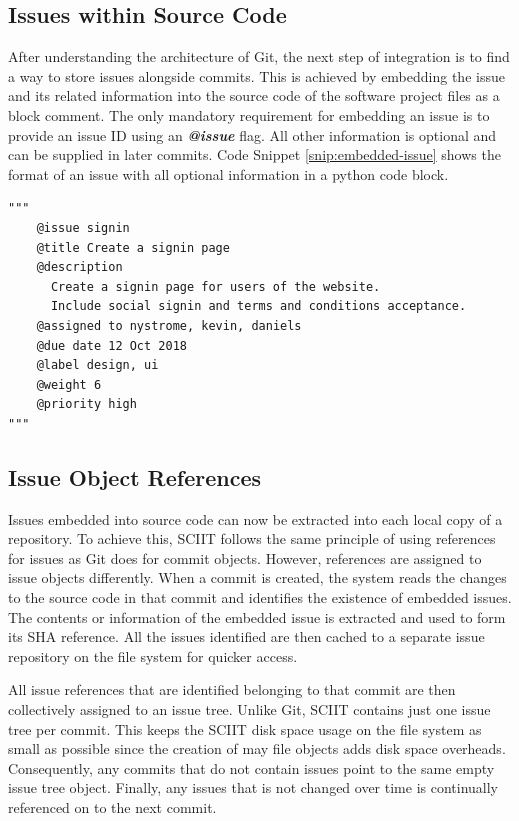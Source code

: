 \documentclass{mproj}
\newenvironment{code}{\captionsetup{type=listing}}{}
\begin{document}
\subsection{Issues within Source Code}

After understanding the architecture of Git, the next step of integration is to find a way to store issues alongside commits. This is achieved by embedding the issue and its related information into the source code of the software project files as a block comment. The only mandatory requirement for embedding an issue is to provide an issue ID using an \textbf{\textit{@issue}} flag. All other information is optional and can be supplied in later commits. Code Snippet \ref{snip:embedded-issue} shows the format of an issue with all optional information in a python code block.

\begin{code}
\label{snip:embedded-issue}
\begin{verbatim}
"""
    @issue signin
    @title Create a signin page
    @description
      Create a signin page for users of the website. 
      Include social signin and terms and conditions acceptance.
    @assigned to nystrome, kevin, daniels
    @due date 12 Oct 2018
    @label design, ui
    @weight 6
    @priority high    
"""
\end{verbatim}
\end{code}


\subsection{Issue Object References}

Issues embedded into source code can now be extracted into each local copy of a repository. To achieve this, SCIIT follows the same principle of using references for issues as Git does for commit objects. However, references are assigned to issue objects differently. When a commit is created, the system reads the changes to the source code in that commit and identifies the existence of embedded issues. The contents or information of the embedded issue is extracted and used to form its SHA reference. All the issues identified are then cached to a separate issue repository on the file system for quicker access.

All issue references that are identified belonging to that commit are then collectively assigned to an issue tree. Unlike Git, SCIIT contains just one issue tree per commit. This keeps the SCIIT disk space usage on the file system as small as possible since the creation of may file objects adds disk space overheads. Consequently, any commits that do not contain issues point to the same empty issue tree object. Finally, any issues that is not changed over time is continually referenced on to the next commit.
\end{document}
